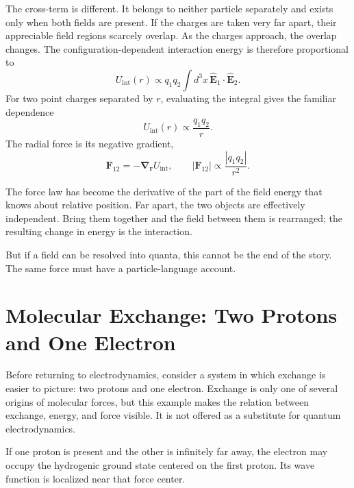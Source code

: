 The cross-term is different. It belongs to neither particle separately and exists only when both fields are present. If the charges are taken very far apart, their appreciable field regions scarcely overlap. As the charges approach, the overlap changes. The configuration-dependent interaction energy is therefore proportional to
\begin{equation}
U_{\text{int}}(r)\propto q_1q_2\int d^3x\,
\widehat{\mathbf E}_1\!\cdot\!\widehat{\mathbf E}_2.
\end{equation}
For two point charges separated by \(r\), evaluating the integral gives the familiar dependence
\begin{equation}
U_{\text{int}}(r)\propto\frac{q_1q_2}{r}.
\end{equation}
The radial force is its negative gradient,
\begin{equation}
\mathbf F_{12}=-\boldsymbol\nabla_{\mathbf r}U_{\text{int}},
\qquad
|\mathbf F_{12}|\propto\frac{|q_1q_2|}{r^2}.
\end{equation}

The force law has become the derivative of the part of the field energy that knows about relative position. Far apart, the two objects are effectively independent. Bring them together and the field between them is rearranged; the resulting change in energy is the interaction.

But if a field can be resolved into quanta, this cannot be the end of the story. The same force must have a particle-language account.

\section{Molecular Exchange: Two Protons and One Electron}

Before returning to electrodynamics, consider a system in which exchange is easier to picture: two protons and one electron. Exchange is only one of several origins of molecular forces, but this example makes the relation between exchange, energy, and force visible. It is not offered as a substitute for quantum electrodynamics.

If one proton is present and the other is infinitely far away, the electron may occupy the hydrogenic ground state centered on the first proton. Its wave function is localized near that force center.

